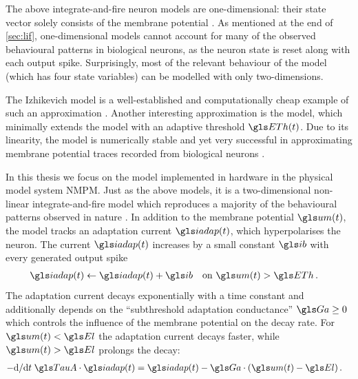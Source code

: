 The above integrate-and-fire neuron models are one-\-dim\-en\-sio\-nal: their state vector solely consists of the membrane potential \um. As mentioned at the end of \cref{sec:lif}, one-dimensional models cannot account for many of the observed behavioural patterns in biological neurons, as the neuron state \um is reset along with each output spike. Surprisingly, most of the relevant behaviour of the \HH model (which has four state variables) can be modelled with only two-dimensions.

The Izhikevich model is a well-established and computationally cheap example of such an approximation \cite{izhikevich2004model}. Another interesting approximation is the \MAT model, which minimally extends the \LIF model with an adaptive threshold $\ETh(t)$. Due to its linearity, the model is numerically stable and yet very successful in approximating membrane potential traces recorded from biological neurons \cite{kobayashi2009made}.

In this thesis we focus on the \AdEx model implemented in hardware in the \HBP physical model system \acrshort{NMPM}. Just as the above models, it is a two-dimensional non-linear integrate-and-fire model which reproduces a majority of the behavioural patterns observed in nature \cite{AdExp2005,AdExpScholarpedia2009}. In addition to the membrane potential $\um(t)$, the \AdEx model tracks an adaptation current $\iadap(t)$, which hyperpolarises the neuron. The current $\iadap(t)$ increases by a small constant $\ib$ with every generated output spike
\begin{align}
	\iadap(t) &\gets \iadap(t) + \ib \quad \text{on } \um(t) > \ETh \,.
	\label{eqn:adex_iadap}
\end{align}
The adaptation current \iadap decays exponentially with a time constant \TauA and additionally depends on the \enquote{subthreshold adaptation conductance} $\Ga \geq 0$ which controls the influence of the membrane potential on the decay rate. For $\um(t) < \El$ the adaptation current decays faster, while $\um(t) > \El$ prolongs the decay:
\begin{align}
 	- \mathrm{d}/\mathrm{d}t \; \TauA \cdot \iadap(t) &= \iadap(t) - \Ga \cdot (\um(t) - \El) \,. \label{eqn:adex_tauA}
\end{align}


